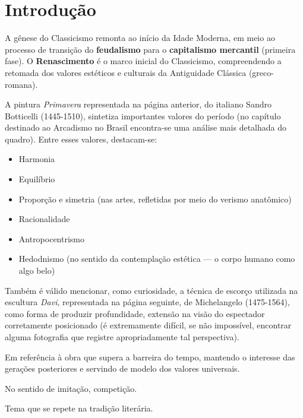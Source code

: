 
\chapter{Introdução}
 
A gênese do Classicismo remonta ao início da Idade Moderna, em meio ao processo de transição do \textbf{feudalismo} para o \textbf{capitalismo mercantil} (primeira fase). O \textbf{Renascimento} é o marco inicial do Classicismo, compreendendo a retomada dos valores estéticos e culturais da Antiguidade Clássica (greco-romana).

A pintura \textit{Primavera} representada na página anterior, do italiano Sandro Botticelli (1445-1510), sintetiza importantes valores do período (no capítulo destinado ao Arcadismo no Brasil encontra-se uma análise mais detalhada do quadro). Entre esses valores, destacam-se:

\begin{itemize}
\item Harmonia
\item Equilíbrio
\item Proporção e simetria (nas artes, refletidas por meio do verismo anatômico)
\item Racionalidade
\item Antropocentrismo
\item Hedodnismo (no sentido da contemplação estética — o corpo humano como algo belo)
\end{itemize}
    
Também é válido mencionar, como curiosidade, a técnica de escorço utilizada na escultura \textit{Davi}, representada na página seguinte, de Michelangelo (1475-1564), como forma de produzir profundidade, extensão na visão do espectador corretamente posicionado (é extremamente difícil, se não impossível, encontrar alguma fotografia que registre apropriadamente tal perspectiva).

\begin{definition}[Clássico]
Em referência à obra que supera a barreira do tempo, mantendo o interesse das gerações posteriores e servindo de modelo dos valores universais.
\end{definition}

\begin{definition}[Emulação]
No sentido de imitação, competição. 
\end{definition}

\begin{definition}
Tema que se repete na tradição literária.
\end{definition}

